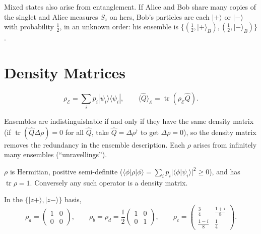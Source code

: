 Mixed states also arise from entanglement. If Alice and Bob share many copies of the singlet and Alice measures $S_z$ on hers, Bob's particles are each $|+\rangle$ or $|-\rangle$ with probability $\frac12$, in an unknown order: his ensemble is $\{(\frac12,|+\rangle_B),(\frac12,|-\rangle_B)\}$.

\section{Density Matrices}

\begin{definition}
\[
    \rho_{\mathcal{E}} = \sum_ip_i|\psi_i\rangle\langle\psi_i|,
    \qquad
    \langle\hat{Q}\rangle_{\mathcal{E}} = \operatorname{tr}(\rho_{\mathcal{E}}\hat{Q}) .
\]
\end{definition}

Ensembles are indistinguishable if and only if they have the same density matrix (if $\operatorname{tr}(\hat{Q}\Delta\rho) = 0$ for all $\hat{Q}$, take $\hat{Q} = \Delta\rho^\dagger$ to get $\Delta\rho = 0$), so the density matrix removes the redundancy in the ensemble description. Each $\rho$ arises from infinitely many ensembles (``unravellings'').

\begin{theorem}
$\rho$ is Hermitian, positive semi-definite ($\langle\phi|\rho|\phi\rangle = \sum_ip_i|\langle\phi|\psi_i\rangle|^2\ge0$), and has $\operatorname{tr}\rho = 1$. Conversely any such operator is a density matrix.
\end{theorem}

\begin{example}
In the $\{|z+\rangle,|z-\rangle\}$ basis,
\[
    \rho_a = \begin{pmatrix}1&0\\0&0\end{pmatrix},
    \qquad
    \rho_b = \rho_d = \frac12\begin{pmatrix}1&0\\0&1\end{pmatrix},
    \qquad
    \rho_c = \begin{pmatrix}\frac34 & \frac{1+i}{8}\\ \frac{1-i}{8} & \frac14\end{pmatrix}.
\]
\end{example}

